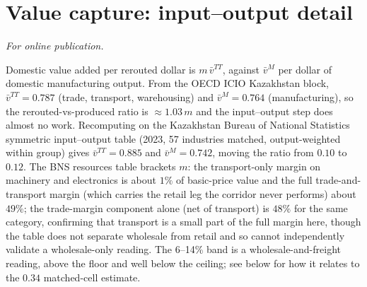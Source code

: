 \documentclass[12pt]{article}
\begin{document}
\section{Value capture: input--output detail}\label{app:io}
\emph{For online publication.}

\medskip
Domestic value added per rerouted dollar is $m\,\bar v^{TT}$, against $\bar v^{M}$ per dollar
of domestic manufacturing output. From the OECD ICIO Kazakhstan block,
$\bar v^{TT} = 0.787$ (trade, transport, warehousing) and $\bar v^{M} = 0.764$ (manufacturing),
so the rerouted-vs-produced ratio is $\approx 1.03\,m$ and the input--output step does almost
no work. Recomputing on the Kazakhstan Bureau of National Statistics symmetric input--output
table (2023, 57 industries matched, output-weighted within group) gives $\bar v^{TT} = 0.885$
and $\bar v^{M} = 0.742$, moving the ratio from $0.10$ to $0.12$. The BNS resources table
brackets $m$: the transport-only margin on machinery and electronics is about $1\%$ of
basic-price value and the full trade-and-transport margin (which carries the retail leg the
corridor never performs) about $49\%$; the trade-margin component alone (net of transport) is
$48\%$ for the same category, confirming that transport is a small part of the full margin
here, though the table does not separate wholesale from retail and so cannot independently
validate a wholesale-only reading. The 6--14\% band is a wholesale-and-freight reading, above
the floor and well below the ceiling; see below for how it relates to the $0.34$ matched-cell
estimate.
\end{document}
